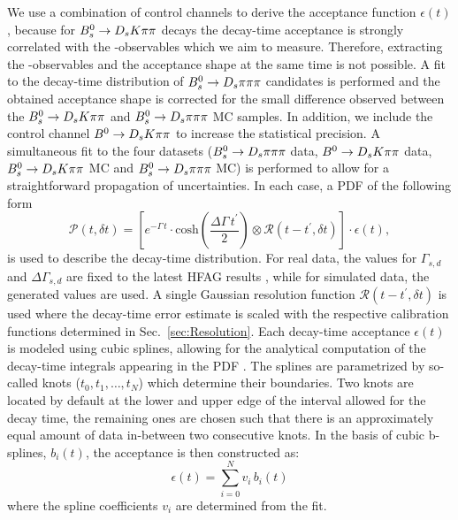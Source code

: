 We use a combination of control channels to derive the acceptance function $\epsilon(t)$, because for ${{B}^0_{s}}\rightarrow{\ensuremath{{D}_{s}}}{\ensuremath{K}}{\ensuremath{\pi}}{\ensuremath{\pi}}$ decays the decay-time acceptance is strongly correlated with the \CP-observables which we aim to measure. Therefore, extracting the \CP-observables and the acceptance shape at the same time is not possible. 
A fit to the decay-time distribution of ${{B}^0_{s}}\rightarrow{\ensuremath{{D}_{s}}}{\ensuremath{\pi}}{\ensuremath{\pi}}{\ensuremath{\pi}}$ candidates is performed and the obtained acceptance shape is corrected for the small difference 
observed between the ${{B}^0_{s}}\rightarrow{\ensuremath{{D}_{s}}}{\ensuremath{K}}{\ensuremath{\pi}}{\ensuremath{\pi}}$ and ${{B}^0_{s}}\rightarrow{\ensuremath{{D}_{s}}}{\ensuremath{\pi}}{\ensuremath{\pi}}{\ensuremath{\pi}}$ MC samples. 
In addition, we include the control channel ${{B}^0}\rightarrow{\ensuremath{{D}_{s}}}{\ensuremath{K}}{\ensuremath{\pi}}{\ensuremath{\pi}}$ to increase the statistical precision.
A simultaneous fit to the four datasets (${{B}^0_{s}}\rightarrow{\ensuremath{{D}_{s}}}{\ensuremath{\pi}}{\ensuremath{\pi}}{\ensuremath{\pi}}$ data, ${{B}^0}\rightarrow{\ensuremath{{D}_{s}}}{\ensuremath{K}}{\ensuremath{\pi}}{\ensuremath{\pi}}$ data, ${{B}^0_{s}}\rightarrow{\ensuremath{{D}_{s}}}{\ensuremath{K}}{\ensuremath{\pi}}{\ensuremath{\pi}}$ MC and ${{B}^0_{s}}\rightarrow{\ensuremath{{D}_{s}}}{\ensuremath{\pi}}{\ensuremath{\pi}}{\ensuremath{\pi}}$ MC)
is performed to allow for a straightforward propagation of uncertainties.
In each case, a PDF of the following form 
\begin{equation}
\mathcal{P}(t,\delta t) = \left[ e^{-\Gamma \, t}\cdot \text{cosh}\left(\frac{\Delta\Gamma \, t^\prime}{2}\right) \otimes \mathcal{R}(t - t^{'}, \delta t)\right] \cdot \epsilon(t),
\label{eq:AccPDF}
\end{equation}
is used to describe the decay-time distribution. 
For real data, the values for $\Gamma_{s,d}$ and $\Delta\Gamma_{s,d}$ are fixed to the latest HFAG results \cite{HFAG},
while for simulated data, the generated values are used.
A  single Gaussian resolution function $\mathcal{R}(t - t^{'}, \delta t)$ is used where the decay-time error estimate is scaled with the respective calibration functions determined in
Sec.~\ref{sec:Resolution}.
Each decay-time acceptance $\epsilon(t)$ is modeled
using cubic splines, allowing for the analytical computation of the decay-time integrals appearing in the PDF \cite{Karbach:2014qba}.
The splines are parametrized by so-called knots ($t_0,t_1,\dots,t_N$) which determine their boundaries. 
Two knots are located by default at the lower and upper edge of the interval allowed for the decay time, the remaining ones are chosen 
such that there is an approximately equal amount of data in-between two consecutive knots.
In the basis of cubic b-splines, $b_i(t)$, the acceptance is then constructed as:
\begin{equation}   
	\epsilon(t) = \sum_{i=0}^N v_i \, b_i(t)   
	\label{eq:Spline}
\end{equation}
where the spline coefficients $v_i$ are determined from the fit.
